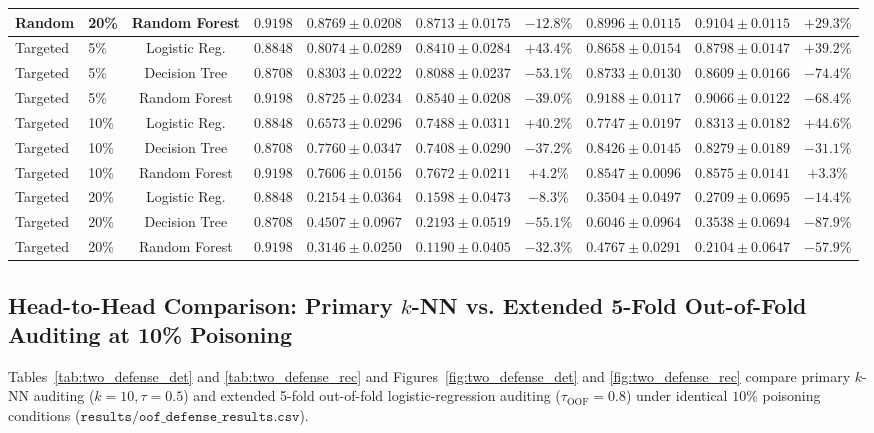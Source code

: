 \documentclass[10pt,conference]{IEEEtran}
\begin{document}
\begin{table}[htbp]
\begin{tabular}{llcccccccc}
Random & 20\% & Random Forest & $0.9198$ & $0.8769 \pm 0.0208$ & $0.8713 \pm 0.0175$ & $-12.8\%$ & $0.8996 \pm 0.0115$ & $\mathbf{0.9104 \pm 0.0115}$ & $\mathbf{+29.3\%}$ \\
\midrule
Targeted & 5\% & Logistic Reg. & $0.8848$ & $0.8074 \pm 0.0289$ & $\mathbf{0.8410 \pm 0.0284}$ & $\mathbf{+43.4\%}$ & $0.8658 \pm 0.0154$ & $\mathbf{0.8798 \pm 0.0147}$ & $\mathbf{+39.2\%}$ \\
Targeted & 5\% & Decision Tree & $0.8708$ & $0.8303 \pm 0.0222$ & $0.8088 \pm 0.0237$ & $-53.1\%$ & $0.8733 \pm 0.0130$ & $0.8609 \pm 0.0166$ & $-74.4\%$ \\
Targeted & 5\% & Random Forest & $0.9198$ & $0.8725 \pm 0.0234$ & $0.8540 \pm 0.0208$ & $-39.0\%$ & $0.9188 \pm 0.0117$ & $0.9066 \pm 0.0122$ & $-68.4\%$ \\
Targeted & 10\% & Logistic Reg. & $0.8848$ & $0.6573 \pm 0.0296$ & $\mathbf{0.7488 \pm 0.0311}$ & $\mathbf{+40.2\%}$ & $0.7747 \pm 0.0197$ & $\mathbf{0.8313 \pm 0.0182}$ & $\mathbf{+44.6\%}$ \\
Targeted & 10\% & Decision Tree & $0.8708$ & $0.7760 \pm 0.0347$ & $0.7408 \pm 0.0290$ & $-37.2\%$ & $0.8426 \pm 0.0145$ & $0.8279 \pm 0.0189$ & $-31.1\%$ \\
Targeted & 10\% & Random Forest & $0.9198$ & $0.7606 \pm 0.0156$ & $\mathbf{0.7672 \pm 0.0211}$ & $\mathbf{+4.2\%}$ & $0.8547 \pm 0.0096$ & $\mathbf{0.8575 \pm 0.0141}$ & $\mathbf{+3.3\%}$ \\
Targeted & 20\% & Logistic Reg. & $0.8848$ & $0.2154 \pm 0.0364$ & $0.1598 \pm 0.0473$ & $-8.3\%$ & $0.3504 \pm 0.0497$ & $0.2709 \pm 0.0695$ & $-14.4\%$ \\
Targeted & 20\% & Decision Tree & $0.8708$ & $0.4507 \pm 0.0967$ & $0.2193 \pm 0.0519$ & $-55.1\%$ & $0.6046 \pm 0.0964$ & $0.3538 \pm 0.0694$ & $-87.9\%$ \\
Targeted & 20\% & Random Forest & $0.9198$ & $0.3146 \pm 0.0250$ & $0.1190 \pm 0.0405$ & $-32.3\%$ & $0.4767 \pm 0.0291$ & $0.2104 \pm 0.0647$ & $-57.9\%$ \\
\bottomrule
\end{tabular}
\end{table}

\subsection{Head-to-Head Comparison: Primary $k$-NN vs. Extended 5-Fold Out-of-Fold Auditing at 10\% Poisoning}
Tables~\ref{tab:two_defense_det} and \ref{tab:two_defense_rec} and Figures~\ref{fig:two_defense_det} and \ref{fig:two_defense_rec} compare primary $k$-NN auditing ($k=10, \tau=0.5$) and extended 5-fold out-of-fold logistic-regression auditing ($\tau_{\text{OOF}}=0.8$) under identical $10\%$ poisoning conditions ($\mathtt{results/oof\_defense\_results.csv}$).
\end{document}
